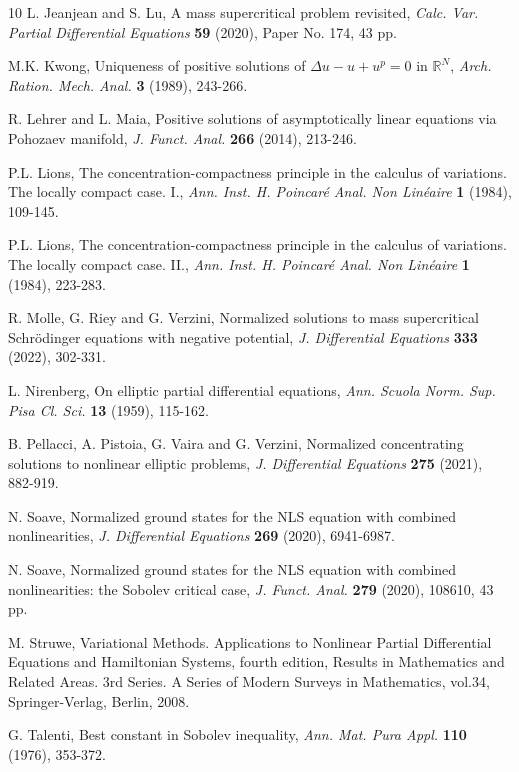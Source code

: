 \documentclass[10pt]{article}
\numberwithin{equation}{section}
\numberwithin{equation}{section}
\begin{document}
\begin{thebibliography}{10}
L. Jeanjean and S. Lu, A mass supercritical problem revisited, {\it Calc. Var. Partial Differential Equations} {\bf 59} (2020), Paper No. 174, 43 pp.

 M.K. Kwong, Uniqueness of positive solutions of $\Delta u-u + u^p = 0$ in $\mathbb{R}^N$, {\it Arch. Ration. Mech. Anal.} {\bf 3} (1989), 243-266.

 R. Lehrer and L. Maia, Positive solutions of asymptotically linear equations via Pohozaev manifold, {\it J. Funct. Anal.} {\bf 266} (2014), 213-246.

 P.L. Lions, The concentration-compactness principle in the calculus of variations. The locally compact case. I., {\it Ann. Inst. H. Poincar\'e Anal. Non Lin\'eaire} {\bf 1} (1984), 109-145.

 P.L. Lions, The concentration-compactness principle in the calculus of variations. The locally compact case. II., {\it Ann. Inst. H. Poincar\'e Anal. Non Lin\'eaire} {\bf 1} (1984), 223-283.

 R. Molle, G. Riey and G. Verzini,  Normalized solutions to mass supercritical Schr\"{o}dinger equations with negative potential, {\it J. Differential Equations} {\bf 333} (2022), 302-331.

 L. Nirenberg, On elliptic partial differential equations, {\it Ann. Scuola Norm. Sup. Pisa Cl. Sci.} {\bf 13} (1959), 115-162.

 B. Pellacci, A. Pistoia, G. Vaira and G. Verzini, Normalized concentrating solutions to nonlinear elliptic problems, {\it J. Differential Equations} {\bf 275} (2021), 882-919.

N. Soave, Normalized ground states for the NLS equation with combined nonlinearities, {\it J. Differential Equations} {\bf 269} (2020), 6941-6987.

N. Soave, Normalized ground states for the NLS equation with combined nonlinearities: the Sobolev critical case, {\it J. Funct. Anal.} {\bf 279} (2020), 108610, 43 pp.

 M. Struwe, Variational Methods. Applications to Nonlinear Partial Differential Equations and Hamiltonian Systems, fourth edition, Results in Mathematics and Related Areas. 3rd Series. A Series of Modern Surveys in Mathematics, vol.34, Springer-Verlag, Berlin, 2008.

 G. Talenti, Best constant in Sobolev inequality, {\it Ann. Mat. Pura Appl.} {\bf 110} (1976), 353-372.


\end{thebibliography}
\end{document}
